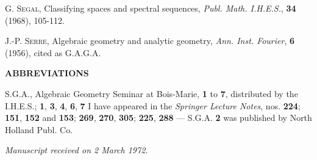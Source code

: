 \documentclass[11pt,leqno]{article}
\begin{document}
{\noindent [14] G. \textsc{Segal}, Classifying spaces and spectral sequences, \textit{Publ. Math. I.H.E.S.}, \textbf{34} (1968), 105-112.

\noindent [15] J.-P. \textsc{Serre}, Algebraic geometry and analytic geometry, \textit{Ann. Inst. Fourier}, \textbf{6} (1956), cited as G.A.G.A.

\begin{center}
\textbf{ABBREVIATIONS}
\end{center}

\noindent S.G.A., Algebraic Geometry Seminar at Bois-Marie, \textbf{1} to \textbf{7}, distributed by the I.H.E.S.; \textbf{1}, \textbf{3}, \textbf{4}, \textbf{6}, \textbf{7} I have appeared in the \textit{Springer Lecture Notes}, nos. \textbf{224}; \textbf{151}, \textbf{152} and \textbf{153}; \textbf{269}, \textbf{270}, \textbf{305}; \textbf{225}, \textbf{288} — S.G.A. \textbf{2} was published by North Holland Publ. Co.
\par
}

\begin{flushright}
\textit{Manuscript received on 2 March 1972.}
\end{flushright}
\end{document}
